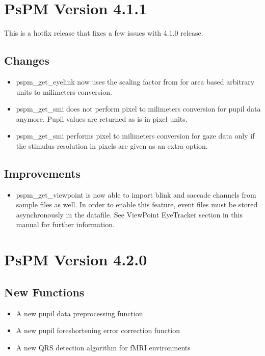 \documentclass[english]{article}
\numberwithin{equation}{section}
\numberwithin{figure}{section}
\begin{document}
\section{PsPM Version 4.1.1}

This is a hotfix release that fixes a few issues with 4.1.0 release.

\subsection*{Changes}
\begin{itemize}
\item pspm\_get\_eyelink now uses the scaling factor from \cite{Hayes:2015a}
for area based arbitrary units to milimeters conversion.
\item pspm\_get\_smi does not perform pixel to milimeters conversion for
pupil data anymore. Pupil values are returned as is in pixel units.
\item pspm\_get\_smi performs pixel to milimeters conversion for gaze data
only if the stimulus resolution in pixels are given as an extra option.
\end{itemize}

\subsection*{Improvements}
\begin{itemize}
\item pspm\_get\_viewpoint is now able to import blink and saccade channels
from sample files as well. In order to enable this feature, event
files must be stored asynchronously in the datafile. See ViewPoint
EyeTracker section in this manual for further information.
\end{itemize}

\section{PsPM Version 4.2.0}

\subsection*{New Functions}
\begin{itemize}
\item A new pupil data preprocessing function
\item A new pupil foreshortening error correction function
\item A new QRS detection algorithm for fMRI environments
\end{itemize}
\end{document}

